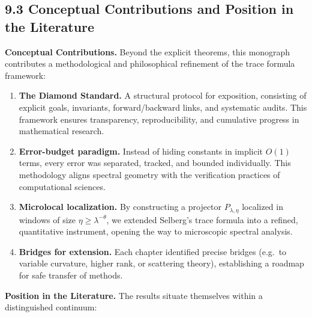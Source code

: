 

\subsection{9.3 Conceptual Contributions and Position in the Literature}

\noindent\textbf{Conceptual Contributions.}
Beyond the explicit theorems, this monograph contributes a methodological
and philosophical refinement of the trace formula framework:

\begin{enumerate}
  \item \textbf{The Diamond Standard.}  
  A structural protocol for exposition, consisting of explicit goals,
  invariants, forward/backward links, and systematic audits.
  This framework ensures transparency, reproducibility,
  and cumulative progress in mathematical research.

  \item \textbf{Error-budget paradigm.}  
  Instead of hiding constants in implicit $O(1)$ terms,
  every error was separated, tracked, and bounded individually.
  This methodology aligns spectral geometry with the verification practices
  of computational sciences.

  \item \textbf{Microlocal localization.}  
  By constructing a projector $P_{\lambda,\eta}$ localized in windows
  of size $\eta \ge \lambda^{-\theta}$,
  we extended Selberg’s trace formula into a refined, quantitative instrument,
  opening the way to microscopic spectral analysis.

  \item \textbf{Bridges for extension.}  
  Each chapter identified precise bridges (e.g.\ to variable curvature,
  higher rank, or scattering theory),
  establishing a roadmap for safe transfer of methods.
\end{enumerate}

\medskip

\noindent\textbf{Position in the Literature.}
The results situate themselves within a distinguished continuum:

